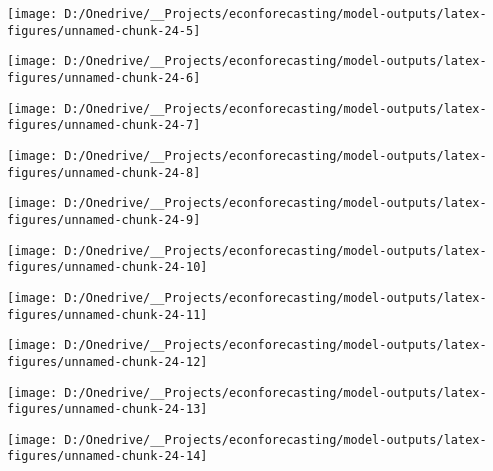 \documentclass[11pt, letterpaper]{article}\usepackage[]{graphicx}\usepackage[]{color}
\begin{document}
{\centering \texttt{[image: D:/Onedrive/\_\_Projects/econforecasting/model-outputs/latex-figures/unnamed-chunk-24-5]} 

}




{\centering \texttt{[image: D:/Onedrive/\_\_Projects/econforecasting/model-outputs/latex-figures/unnamed-chunk-24-6]} 

}




{\centering \texttt{[image: D:/Onedrive/\_\_Projects/econforecasting/model-outputs/latex-figures/unnamed-chunk-24-7]} 

}




{\centering \texttt{[image: D:/Onedrive/\_\_Projects/econforecasting/model-outputs/latex-figures/unnamed-chunk-24-8]} 

}




{\centering \texttt{[image: D:/Onedrive/\_\_Projects/econforecasting/model-outputs/latex-figures/unnamed-chunk-24-9]} 

}




{\centering \texttt{[image: D:/Onedrive/\_\_Projects/econforecasting/model-outputs/latex-figures/unnamed-chunk-24-10]} 

}




{\centering \texttt{[image: D:/Onedrive/\_\_Projects/econforecasting/model-outputs/latex-figures/unnamed-chunk-24-11]} 

}




{\centering \texttt{[image: D:/Onedrive/\_\_Projects/econforecasting/model-outputs/latex-figures/unnamed-chunk-24-12]} 

}




{\centering \texttt{[image: D:/Onedrive/\_\_Projects/econforecasting/model-outputs/latex-figures/unnamed-chunk-24-13]} 

}




{\centering \texttt{[image: D:/Onedrive/\_\_Projects/econforecasting/model-outputs/latex-figures/unnamed-chunk-24-14]} 

}
\end{document}
